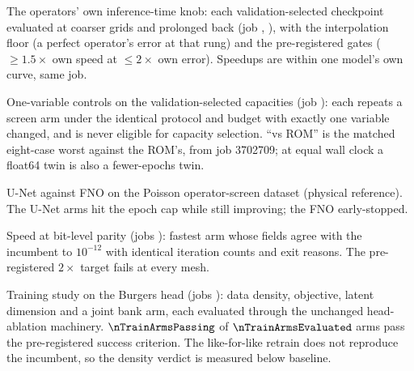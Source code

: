 \begin{table}[h]
\centering
\caption{The operators' own inference-time knob: each validation-selected
checkpoint evaluated at coarser grids and prolonged back (job \provResJob,
\provResGpu), with the interpolation floor (a perfect operator's error at that
rung) and the pre-registered gates ($\ge1.5\times$ own speed at $\le2\times$
own error). Speedups are within one model's own curve, same job.}
\label{tab:resolution}

\end{table}

\begin{table}[h]
\centering
\caption{One-variable controls on the validation-selected capacities (job
\provOpCtrlJob): each repeats a screen arm under the identical protocol and
budget with exactly one variable changed, and is never eligible for capacity
selection. ``vs ROM'' is the matched eight-case worst against the ROM's, from
job 3702709; at equal wall clock a float64 twin is also a fewer-epochs twin.}
\label{tab:op-controls}
\resizebox{\linewidth}{!}{}
\end{table}

\begin{table}[h]
\centering
\caption{U-Net against FNO on the Poisson operator-screen dataset (physical
reference). The U-Net arms hit the epoch cap while still improving; the FNO
early-stopped.}
\label{tab:operators-poisson}

\end{table}

\begin{table}[h]
\centering
\caption{Speed at bit-level parity (jobs \provSpeedJobs): fastest arm whose
fields agree with the incumbent to $10^{-12}$ with identical iteration counts
and exit reasons. The pre-registered $2\times$ target fails at every mesh.}
\label{tab:speed}

\end{table}

\begin{table}[h]
\centering
\caption{Training study on the Burgers head (jobs \provTrainJobs): data
density, objective, latent dimension and a joint bank arm, each evaluated
through the unchanged head-ablation machinery. $\nTrainArmsPassing$ of
$\nTrainArmsEvaluated$ arms pass the pre-registered success criterion. The
like-for-like retrain does not reproduce the incumbent, so the density verdict
is measured below baseline.}
\label{tab:training}
\resizebox{\linewidth}{!}{}
\end{table}

